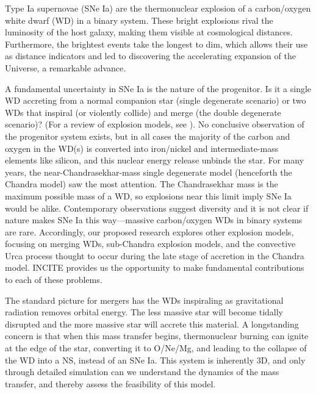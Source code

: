 Type Ia supernovae (SNe Ia) are the thermonuclear explosion of a
carbon/oxygen white dwarf (WD) in a binary system.  These bright
explosions rival the luminosity of the host galaxy, making them
visible at cosmological distances. Furthermore, the
brightest events take the longest to dim, which allows their use as
distance indicators and led to discovering the accelerating 
expansion of the Universe, a remarkable advance.

A fundamental uncertainty in SNe Ia is the nature
of the progenitor. Is it a single WD accreting from a normal companion star
(single degenerate scenario) or two WDs that inspiral (or
violently collide) and merge (the double degenerate scenario)? (For a
review of explosion models, see \cite{calder:2013}).  No conclusive 
observation of the progenitor system exists, but in all cases 
the majority of the carbon and oxygen in the WD(s) is converted into
iron/nickel and intermediate-mass elements like silicon, and this
nuclear energy release unbinds the star.
For many years, the near-Chandrasekhar-mass single degenerate model
(henceforth the Chandra model) saw the most attention.  The
Chandrasekhar mass is the maximum possible mass of a WD, so
explosions near this limit imply SNe Ia would be alike.  Contemporary
observations suggest diversity and it is not clear if nature makes SNe
Ia this way---massive carbon/oxygen WDs in binary systems are rare.  
Accordingly, our proposed research explores other explosion models,
focusing on merging WDs, sub-Chandra explosion models, and the convective 
Urca process thought to occur during the late stage of accretion in the
Chandra model.  INCITE provides us the opportunity to make fundamental
contributions to each of these problems.

The standard picture for mergers has the WDs
inspiraling as gravitational radiation removes orbital energy.
The less massive star will become tidally disrupted and the more
massive star will accrete this material.  A longstanding concern is
that when this mass transfer begins, thermonuclear burning can ignite
at the edge of the star, converting it to O/Ne/Mg, and leading to the
collapse of the WD into a NS, instead of an SNe Ia.
This system is inherently 3D, and only through detailed simulation
can we understand the dynamics of the mass transfer, and thereby
assess the feasibility of this model.

